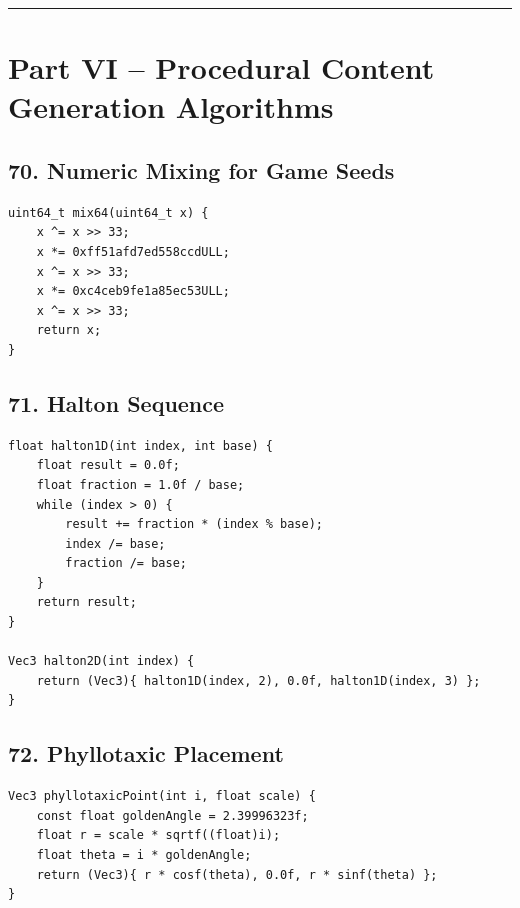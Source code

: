 \documentclass[10pt,letterpaper]{article}
\begin{document}
\medskip\hrule\medskip

\clearpage
\section*{Part VI -- Procedural Content Generation Algorithms}

\subsection*{70. Numeric Mixing for Game Seeds}
{}

\begin{verbatim}
uint64_t mix64(uint64_t x) {
    x ^= x >> 33;
    x *= 0xff51afd7ed558ccdULL;
    x ^= x >> 33;
    x *= 0xc4ceb9fe1a85ec53ULL;
    x ^= x >> 33;
    return x;
}
\end{verbatim}

\subsection*{71. Halton Sequence}
{}

\begin{verbatim}
float halton1D(int index, int base) {
    float result = 0.0f;
    float fraction = 1.0f / base;
    while (index > 0) {
        result += fraction * (index % base);
        index /= base;
        fraction /= base;
    }
    return result;
}

Vec3 halton2D(int index) {
    return (Vec3){ halton1D(index, 2), 0.0f, halton1D(index, 3) };
}
\end{verbatim}

\subsection*{72. Phyllotaxic Placement}
{}

\begin{verbatim}
Vec3 phyllotaxicPoint(int i, float scale) {
    const float goldenAngle = 2.39996323f;
    float r = scale * sqrtf((float)i);
    float theta = i * goldenAngle;
    return (Vec3){ r * cosf(theta), 0.0f, r * sinf(theta) };
}
\end{verbatim}
\end{document}

